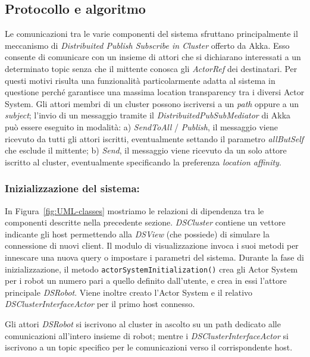 \subsection{Protocollo e algoritmo}
\label{sec:protocols}

Le comunicazioni tra le varie componenti del sistema sfruttano
principalmente il meccanismo di
\emph{Distribuited Publish Subscribe in Cluster} offerto da Akka.
Esso consente di comunicare con un insieme di attori che si
dichiarano interessati a un determinato topic senza che il mittente
conosca gli \emph{ActorRef} dei destinatari. Per questi motivi
risulta una funzionalità particolarmente adatta al sistema in questione
perché garantisce una massima location transparency tra i diversi
Actor System.
Gli attori membri di un cluster possono iscriversi a un \emph{path}
oppure a un \emph{subject}; l'invio di un messaggio tramite il
\emph{DistribuitedPubSubMediator} di Akka può essere eseguito in
modalità: a) \emph{SendToAll} / \emph{Publish}, il messaggio viene
ricevuto da tutti gli attori iscritti, eventualmente settando il
parametro \emph{allButSelf} che esclude il mittente;
b) \emph{Send}, il messaggio viene ricevuto da un solo attore
iscritto al cluster, eventualmente specificando la preferenza
\emph{location affinity}.

\subsubsection*{Inizializzazione del sistema:}
In Figura~\ref{fig:UML-classes} mostriamo le relazioni di
dipendenza tra le componenti descritte nella precedente sezione.
\emph{DSCluster} contiene un vettore indicante gli host
permettendo alla \emph{DSView} (che possiede) di simulare
la connessione di nuovi client.
Il modulo di visualizzazione invoca i suoi metodi per innescare
una nuova query o impostare i parametri del sistema.
Durante la fase di inizializzazione,
il metodo \texttt{actorSystemInitialization()} crea gli Actor
System per i robot
un numero pari a quello definito dall'utente,
e crea in essi l'attore principale \emph{DSRobot}. Viene inoltre
creato l'Actor System e il relativo \emph{DSClusterInterfaceActor}
per il primo host connesso.

Gli attori \emph{DSRobot} si iscrivono al cluster in ascolto su un
path dedicato alle comunicazioni all'intero insieme di robot;
mentre i \emph{DSClusterInterfaceActor} si iscrivono a un topic
specifico per le comunicazioni verso il corrispondente host.

